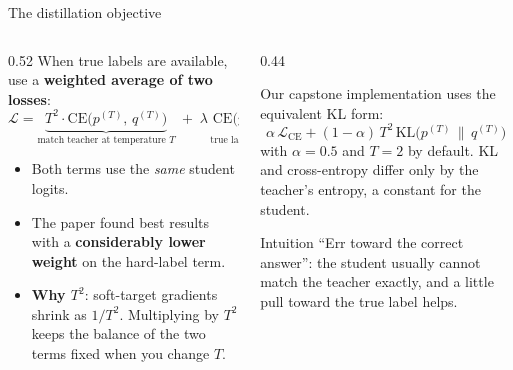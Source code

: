 \documentclass[aspectratio=169,11pt]{beamer}
\begin{document}
\begin{frame}{The distillation objective}
  \begin{columns}[T]
    \begin{column}{0.52\textwidth}
      \small
      When true labels are available, use a \textbf{weighted average of two losses}:
      \[
        \mathcal{L}= \underbrace{T^2\cdot \text{CE}\big(p^{(T)},\,q^{(T)}\big)}_{\text{match teacher at temperature }T}
        \;+\;\lambda\,\underbrace{\text{CE}\big(y,\,q^{(1)}\big)}_{\text{true label at }T=1}
      \]
      \begin{itemize}
        \item Both terms use the \emph{same} student logits.
        \item The paper found best results with a \textbf{considerably lower weight} on the hard-label term.
        \item \textbf{Why $T^2$}: soft-target gradients shrink as $1/T^2$. Multiplying by $T^2$ keeps the balance of the two terms fixed when you change $T$.
      \end{itemize}
    \end{column}
    \begin{column}{0.44\textwidth}
      \begin{block}{Our capstone implementation}
        \small
         uses the equivalent KL form:
        \[
          \alpha\,\mathcal{L}_{\text{CE}}+(1-\alpha)\,T^2\,\mathrm{KL}\big(p^{(T)}\,\|\,q^{(T)}\big)
        \]
        with $\alpha=0.5$ and $T=2$ by default. KL and cross-entropy differ only by the teacher's entropy, a constant for the student.
      \end{block}
      \begin{exampleblock}{Intuition}
        \small
        ``Err toward the correct answer'': the student usually cannot match the teacher exactly, and a little pull toward the true label helps.
      \end{exampleblock}
    \end{column}
  \end{columns}
\end{frame}
\end{document}
